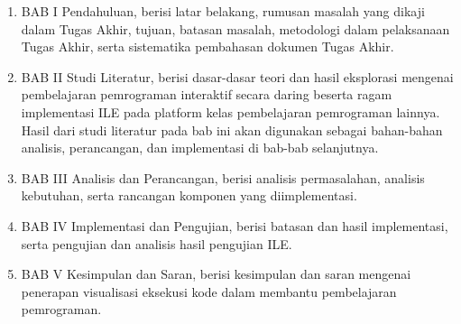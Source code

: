 \begin{enumerate}
      \item BAB I Pendahuluan, berisi latar belakang, rumusan masalah yang dikaji dalam Tugas Akhir, tujuan, batasan masalah, metodologi dalam pelaksanaan Tugas Akhir, serta sistematika pembahasan dokumen Tugas Akhir.
      \item BAB II Studi Literatur, berisi dasar-dasar teori dan hasil eksplorasi mengenai pembelajaran pemrograman interaktif secara daring beserta ragam implementasi ILE pada platform kelas pembelajaran pemrograman lainnya. Hasil dari studi literatur pada bab ini akan digunakan sebagai bahan-bahan analisis, perancangan, dan implementasi di bab-bab selanjutnya.
      \item BAB III Analisis dan Perancangan, berisi analisis permasalahan, analisis kebutuhan, serta rancangan komponen yang diimplementasi.
      \item BAB IV Implementasi dan Pengujian, berisi batasan dan hasil implementasi, serta pengujian dan analisis hasil pengujian ILE.
      \item BAB V Kesimpulan dan Saran, berisi kesimpulan dan saran mengenai penerapan visualisasi eksekusi kode dalam membantu pembelajaran pemrograman.
\end{enumerate}